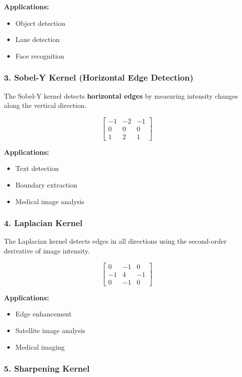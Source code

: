\documentclass[11pt]{article}
\begin{document}
\textbf{Applications:}
\begin{itemize}
\item Object detection
\item Lane detection
\item Face recognition
\end{itemize}

\subsubsection*{3. Sobel-Y Kernel (Horizontal Edge Detection)}

The Sobel-Y kernel detects \textbf{horizontal edges} by measuring intensity changes along the vertical direction.

\[
\begin{bmatrix}
-1 & -2 & -1\\
0 & 0 & 0\\
1 & 2 & 1
\end{bmatrix}
\]

\textbf{Applications:}
\begin{itemize}
\item Text detection
\item Boundary extraction
\item Medical image analysis
\end{itemize}

\subsubsection*{4. Laplacian Kernel}

The Laplacian kernel detects edges in all directions using the second-order derivative of image intensity.

\[
\begin{bmatrix}
0 & -1 & 0\\
-1 & 4 & -1\\
0 & -1 & 0
\end{bmatrix}
\]

\textbf{Applications:}
\begin{itemize}
\item Edge enhancement
\item Satellite image analysis
\item Medical imaging
\end{itemize}

\subsubsection*{5. Sharpening Kernel}
\end{document}
